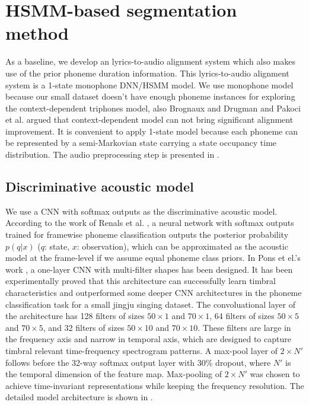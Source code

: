 \section{HSMM-based segmentation method}\label{sec:ch5:hsmm_segmentation}

As a baseline, we develop an lyrics-to-audio alignment system which also makes use of the prior phoneme duration information. This lyrics-to-audio alignment system is a 1-state monophone \gls{DNN}/\gls{HSMM} model. We use monophone model because our small dataset doesn't have enough phoneme instances for exploring the context-dependent triphones model, also Brognaux and Drugman \cite{brognaux2016hmm} and Pakoci et al. \cite{pakoci2016phonetic} argued that context-dependent model can not bring significant alignment improvement. It is convenient to apply 1-state model because each phoneme can be represented by a semi-Markovian state carrying a state occupancy time distribution. The audio preprocessing step is presented in .

\subsection{Discriminative acoustic model}

We use a \gls{CNN} with softmax outputs as the discriminative acoustic model. According to the work of Renals et al. \cite{Renals1994Connectionist}, a neural network with softmax outputs trained for framewise phoneme classification outputs the posterior probability $p(q|x)$ ($q$: state, $x$: observation), which can be approximated as the acoustic model at the frame-level if we assume equal phoneme class priors. In Pons et el.'s work \cite{Pons2017Timbre}, a one-layer \gls{CNN} with multi-filter shapes has been designed. It has been experimentally proved that this architecture can successfully learn timbral characteristics and outperformed some deeper \gls{CNN} architectures in the phoneme classification task for a small jingju singing dataset. The convoluational layer of the architecture has 128 filters of sizes $50{\times}1$ and $70{\times}1$, 64 filters of sizes $50{\times}5$ and $70{\times}5$, and 32 filters of sizes $50{\times}10$ and $70{\times}10$. These filters are large in the frequency axis and narrow in temporal axis, which are designed to capture timbral relevant time-frequency spectrogram patterns. A max-pool layer of $2{\times}N'$ follows before the 32-way softmax output layer with 30\% dropout, where $N'$ is the temporal dimension of the feature map. Max-pooling of $2{\times}N'$ was chosen to achieve time-invariant representations
while keeping the frequency resolution. The detailed model architecture is shown in .

